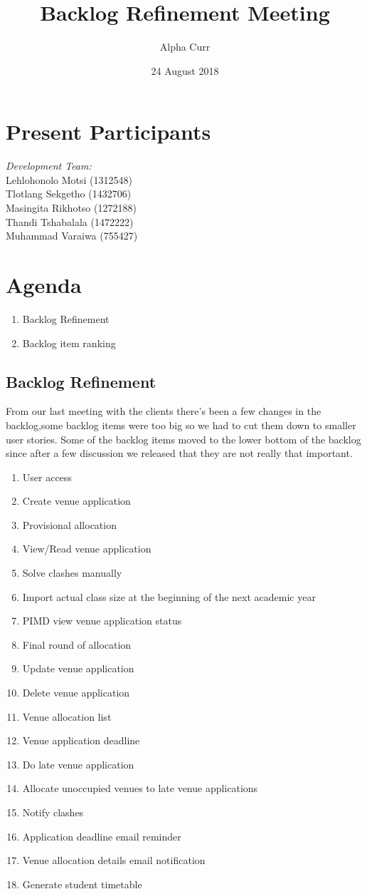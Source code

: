 \documentclass[11pt]{article}
\title{Backlog Refinement Meeting}
\author{Alpha Curr}
\date{24 August 2018}
\begin{document}
\maketitle

\section{Present Participants}
\textit{Development Team:}\\
Lehlohonolo Motsi (1312548)\\
Tlotlang Sekgetho (1432706)\\
Masingita Rikhotso (1272188)\\
Thandi Tshabalala (1472222)\\
Muhammad Varaiwa (755427)

\section{Agenda}
\begin{enumerate}
\item Backlog Refinement
\item Backlog item ranking
\end{enumerate}

\subsection{Backlog Refinement}
From our last meeting with the clients there's been a few changes in the backlog,some backlog items were too big so we had to cut them down to smaller user stories. Some of the backlog items moved to the lower bottom of the backlog since after a few discussion we released that they are not really that important.\\
\begin{enumerate}
	\item User access
	\item Create venue application
	\item Provisional allocation
	\item View/Read venue application
	\item Solve clashes manually
	\item Import actual class size at the beginning of the next academic year
	\item PIMD view venue application status
	\item Final round of allocation
	\item Update venue application
	\item Delete venue application
	\item Venue allocation list
	\item Venue application deadline
	\item Do late venue application
	\item Allocate unoccupied venues to late venue applications
	\item Notify clashes
	\item Application deadline email reminder
	\item Venue allocation details email notification
	\item Generate student timetable
\end{enumerate}
\end{document}
